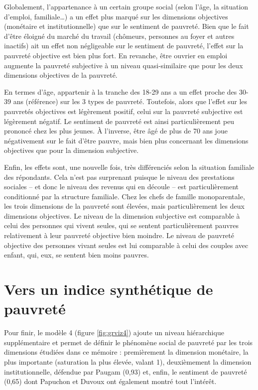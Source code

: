 \documentclass[12pt,a4paper]{reedthesis}
\begin{document}
Globalement, l'appartenance à un certain groupe social (selon l'âge, la situation d'emploi, familiale\ldots) a un effet plus marqué sur les dimensions objectives (monétaire et institutionnelle) que sur le sentiment de pauvreté. Bien que le fait d'être éloigné du marché du travail (chômeurs, personnes au foyer et autres inactifs) ait un effet non négligeable sur le sentiment de pauvreté, l'effet sur la pauvreté objective est bien plus fort. En revanche, être ouvrier en emploi augmente la pauvreté subjective à un niveau quasi-similaire que pour les deux dimensions objectives de la pauvreté.

En termes d'âge, appartenir à la tranche des 18-29 ans a un effet proche des 30-39 ans (référence) sur les 3 types de pauvreté. Toutefois, alors que l'effet sur les pauvretés objectives est légèrement positif, celui sur la pauvreté subjective est légèrement négatif. Le sentiment de pauvreté est ainsi particulièrement peu prononcé chez les plus jeunes. À l'inverse, être âgé de plus de 70 ans joue négativement sur le fait d'être pauvre, mais bien plus concernant les dimensions objectives que pour la dimension subjective.

Enfin, les effets sont, une nouvelle fois, très différenciés selon la situation familiale des répondants. Cela n'est pas surprenant puisque le niveau des prestations sociales -- et donc le niveau des revenus qui en découle -- est particulièrement conditionné par la structure familiale. Chez les chefs de famille monoparentale, les trois dimensions de la pauvreté sont élevées, mais particulièrement les deux dimensions objectives. Le niveau de la dimension subjective est comparable à celui des personnes qui vivent seules, qui se sentent particulièrement pauvres relativement à leur pauvreté objective bien moindre. Le niveau de pauvreté objective des personnes vivant seules est lui comparable à celui des couples avec enfant, qui, eux, se sentent bien moins pauvres.

\hypertarget{sec:esconfiglobal}{%
\section{Vers un indice synthétique de pauvreté}\label{sec:esconfiglobal}}

Pour finir, le modèle 4 (figure \ref{fig:grviz4}) ajoute un niveau hiérarchique supplémentaire et permet de définir le phénomène social de pauvreté par les trois dimensions étudiées dans ce mémoire : premièrement la dimension monétaire, la plus importante (saturation la plus élevée, valant 1), deuxièmement la dimension institutionnelle, défendue par Paugam (0,93) et, enfin, le sentiment de pauvreté (0,65) dont Papuchon et Duvoux ont également montré tout l'intérêt.
\end{document}
